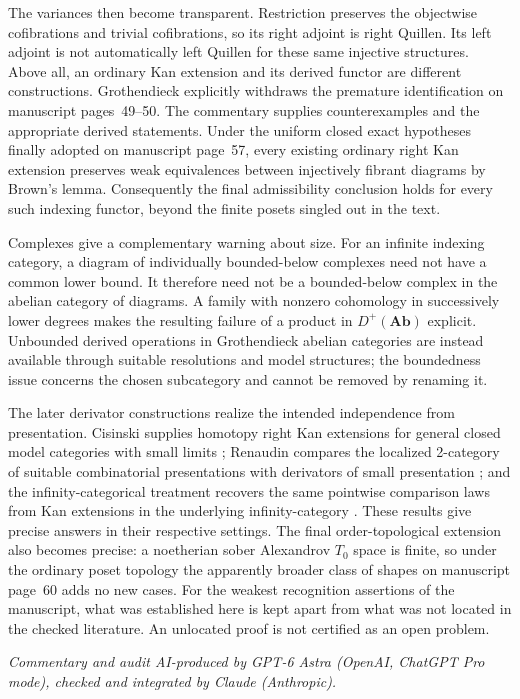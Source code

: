 The variances then become transparent. Restriction preserves the
objectwise cofibrations and trivial cofibrations, so its right adjoint is
right Quillen. Its left adjoint is not automatically left Quillen for these
same injective structures. Above all, an ordinary Kan extension and its
derived functor are different constructions. Grothendieck explicitly
withdraws the premature identification on manuscript pages~49--50. The
commentary supplies counterexamples and the appropriate derived statements.
Under the uniform closed exact hypotheses finally adopted on manuscript
page~57, every existing ordinary right Kan extension preserves weak
equivalences between injectively fibrant diagrams by Brown's lemma.
Consequently the final admissibility conclusion holds for every such
indexing functor, beyond the finite posets singled out in the text.

Complexes give a complementary warning about size. For an infinite
indexing category, a diagram of individually bounded-below complexes need
not have a common lower bound. It therefore need not be a bounded-below
complex in the abelian category of diagrams. A family with nonzero
cohomology in successively lower degrees makes the resulting failure of a
product in $D^+(\mathbf{Ab})$ explicit. Unbounded derived operations in
Grothendieck abelian categories are instead available through suitable
resolutions and model structures; the boundedness issue concerns the
chosen subcategory and cannot be removed by renaming it.

The later derivator constructions realize the intended independence from
presentation. Cisinski supplies homotopy right Kan extensions for general
closed model categories with small limits
\citep[Theorem~6.11]{Cisinski2003}; Renaudin compares the localized
2-category of suitable combinatorial presentations with derivators of
small presentation \citep[Theorems~3.3.2 and~3.4.4]{Renaudin2009}; and the
infinity-categorical treatment recovers the same pointwise comparison
laws from Kan extensions in the underlying infinity-category
\citep[Proposition~5.3.9 and Remark~5.3.10]{RiehlVerity2017}. These results
give precise answers in their respective settings. The final
order-topological extension also becomes precise: a noetherian sober
Alexandrov $T_0$ space is finite, so under the ordinary poset topology the
apparently broader class of shapes on manuscript page~60 adds no new cases.
For the weakest recognition assertions of the manuscript, what was
established here is kept apart from what was not located in the checked
literature. An unlocated proof is not certified as an open problem.

\medskip
\noindent\textit{Commentary and audit AI-produced by GPT-6 Astra (OpenAI,
ChatGPT Pro mode), checked and integrated by Claude (Anthropic).}
